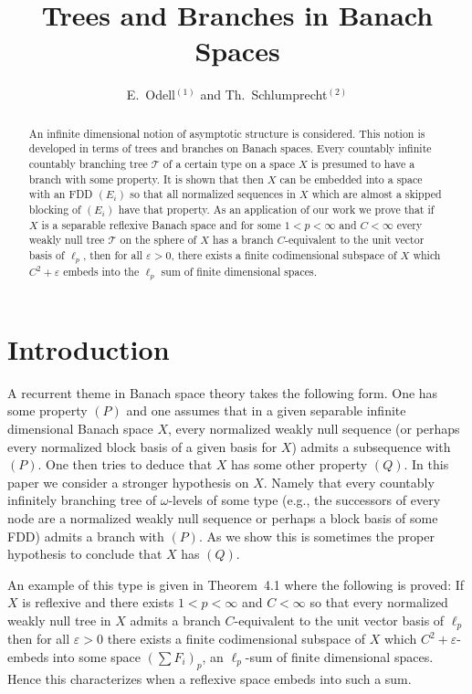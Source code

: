 \documentclass[11pt,leqno]{amsart}
\author{E.~Odell$^{(1)}$  and Th.~Schlumprecht$^{(2)}$}
\title{Trees and Branches in Banach Spaces}
\theoremstyle{definition}
\newcommand{\vp}{\varepsilon}
\newcommand{\cT}{\mathcal{T}}
\begin{document}
\begin{abstract}
An infinite dimensional notion of asymptotic structure is considered. 
This notion is developed in terms of trees and branches on Banach spaces. 
Every countably infinite countably branching tree $\cT$ of a certain type on 
a space $X$ is presumed to have a branch with some property. 
It is shown that then $X$ can be embedded into a space with an FDD 
$(E_i)$ so that all normalized sequences in $X$ which are almost a skipped 
blocking of $(E_i)$ have that property. 
As an application of our work we prove that if $X$ is a separable reflexive 
Banach space and for some $1<p<\infty$ and $C<\infty$ every weakly null 
tree $\cT$ on the sphere of 
$X$ has a branch $C$-equivalent to the unit vector basis of 
$\ell_p$, then for all $\vp>0$, 
there exists a finite codimensional subspace of $X$ which 
$C^2+\vp$ embeds into the $\ell_p$ sum 
of finite dimensional spaces. 
\end{abstract}
\maketitle
{}


\baselineskip=15pt


\section{Introduction}\label{S0}

A recurrent theme in Banach space theory takes the following form. 
One has some property $(P)$ and one assumes that in a given separable infinite 
dimensional Banach space $X$, every normalized weakly null sequence (or 
perhaps every normalized block basis of a given basis for $X$) admits a 
subsequence with $(P)$. 
One then tries to deduce that $X$ has some other property $(Q)$. 
In this paper we consider a stronger hypothesis on $X$. 
Namely that every countably infinitely branching tree of 
$\omega$-levels of some  type (e.g., the successors of every node are a 
normalized weakly null sequence or perhaps a block basis of some FDD) 
admits a branch with $(P)$. 
As we show this is sometimes the proper hypothesis to conclude that $X$ 
has $(Q)$. 

An example of this type is given in Theorem~4.1 where the following is 
proved: 
If $X$ is reflexive and there exists $1<p<\infty$ and $C<\infty$ so that 
every normalized weakly null tree in $X$ admits a branch $C$-equivalent to 
the unit vector basis of $\ell_p$ then for all $\vp>0$ 
there exists a finite codimensional subspace of $X$ which 
$C^2+\vp$-embeds into some space $(\sum F_i)_p$, an $\ell_p$-sum of 
finite dimensional spaces. 
Hence this characterizes when a reflexive space embeds into such a sum. 
\end{document}
